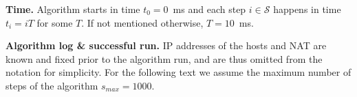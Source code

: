 \documentclass{acm_proc_article-sp}
\begin{document}
\par\smallskip
\noindent\textbf{Time.} 
Algorithm starts in time $t_0 = 0$~ms and each step $i \in \mathcal{S}$
happens in time $t_i = iT$ for some $T$. If not mentioned otherwise, $T = 10$~ms.

\par\smallskip
\noindent\textbf{Algorithm log \& successful run.} 
IP addresses of the hosts and NAT are known and fixed prior to the algorithm run, and are thus omitted from the notation for simplicity. For the following text we assume the maximum number of steps of the algorithm $s_{max}=1000$.
\end{document}
